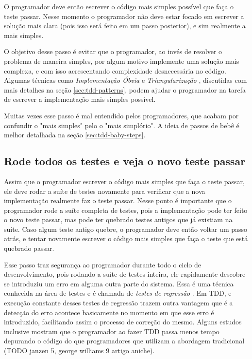 O programador deve então escrever o código mais simples possível que faça o teste passar. Nesse momento o programador não deve estar
focado em escrever a solução mais clara (pois isso será feito em um passo posterior), e sim realmente a mais simples.

O objetivo desse passo é evitar que o programador, ao invés de resolver o problema de maneira simples, por algum motivo
implemente uma solução mais complexa, e com isso acrescentando complexidade desnecessária no código. Algumas técnicas como
\textit{Implementação Óbvia} e \textit{Triangularização} \cite{TDDByExample}, discutidas com mais detalhes na seção \ref{sec:tdd-patterns}, 
podem ajudar o programador na tarefa de escrever a implementação mais simples possível.

Muitas vezes esse passo é mal entendido pelos programadores, que acabam por confundir o "mais simples" pelo o "mais simplório". 
A ideia de passos de bebê \cite{TDDByExample} é melhor detalhada na seção \ref{sec:tdd-baby-steps}.

\subsection{Rode todos os testes e veja o novo teste passar}

Assim que o programador escrever o código mais simples que faça o teste passar, ele deve rodar a suíte de testes novamente
para verificar que a nova implementação realmente faz o teste passar. Nesse ponto é importante que o programador rode a suíte 
completa de testes, pois a implementação pode ter feito o novo teste passar, mas pode ter quebrado testes antigos que já existiam na suíte. 
Caso algum teste antigo quebre, o programador deve então voltar um passo atrás, e tentar novamente escrever o código mais simples
que faça o teste que está quebrado passar.

Esse passo traz segurança ao programador durante todo o ciclo de desenvolvimento, pois rodando a suíte de testes inteira, 
ele rapidamente descobre se introduziu um erro em alguma outra parte do sistema. Essa é uma técnica conhecida na área de testes e é
chamada de \textit{testes de regressão} \cite{art-of-sw-testing}. Em TDD, e execução constante desses testes de regressão 
trazem outra vantagem que é a detecção do erro acontece basicamente no momento em que esse erro é introduzido, facilitando assim
o processo de correção do mesmo. Alguns estudos inclusive mostram que o programador ao fazer TDD passa menos tempo depurando o código
do que programadores que utilizam a abordagem tradicional (TODO janzen 5, george williams 9 artigo aniche).

